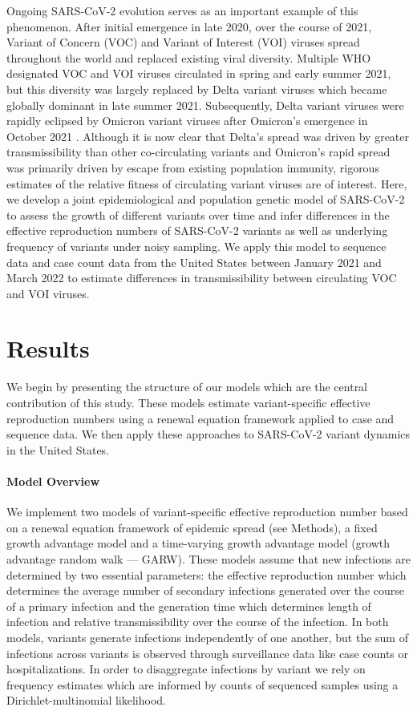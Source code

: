 \documentclass[11pt,oneside,letterpaper]{article}
\begin{document}
Ongoing SARS-CoV-2 evolution serves as an important example of this phenomenon.
After initial emergence in late 2020, over the course of 2021, Variant of Concern (VOC) and Variant of Interest (VOI) viruses spread throughout the world and replaced existing viral diversity.
Multiple WHO designated \cite{Konings2021} VOC and VOI viruses circulated in spring and early summer 2021, but this diversity was largely replaced by Delta variant viruses which became globally dominant in late summer 2021.
Subsequently, Delta variant viruses were rapidly eclipsed by Omicron variant viruses after Omicron's emergence in October 2021 \cite{viana2022rapid}.
Although it is now clear that Delta's spread was driven by greater transmissibility than other co-circulating variants and Omicron's rapid spread was primarily driven by escape from existing population immunity, rigorous estimates of the relative fitness of circulating variant viruses are of interest.
Here, we develop a joint epidemiological and population genetic model of SARS-CoV-2 to assess the growth of different variants over time and infer differences in the effective reproduction numbers of SARS-CoV-2 variants as well as underlying frequency of variants under noisy sampling.
We apply this model to sequence data and case count data from the United States between January 2021 and March 2022 to estimate differences in transmissibility between circulating VOC and VOI viruses.

\section*{Results}

We begin by presenting the structure of our models which are the central contribution of this study.
These models estimate variant-specific effective reproduction numbers using a renewal equation framework applied to case and sequence data.
We then apply these approaches to SARS-CoV-2 variant dynamics in the United States.

\paragraph{Model Overview}%

We implement two models of variant-specific effective reproduction number based on a renewal equation framework of epidemic spread (see Methods), a fixed growth advantage model and a time-varying growth advantage model (growth advantage random walk --- GARW).
These models assume that new infections are determined by two essential parameters: the effective reproduction number which determines the average number of secondary infections generated over the course of a primary infection and the generation time which determines length of infection and relative transmissibility over the course of the infection.
In both models, variants generate infections independently of one another, but the sum of infections across variants is observed through surveillance data like case counts or hospitalizations.
In order to disaggregate infections by variant we rely on frequency estimates which are informed by counts of sequenced samples using a Dirichlet-multinomial likelihood.
\end{document}

